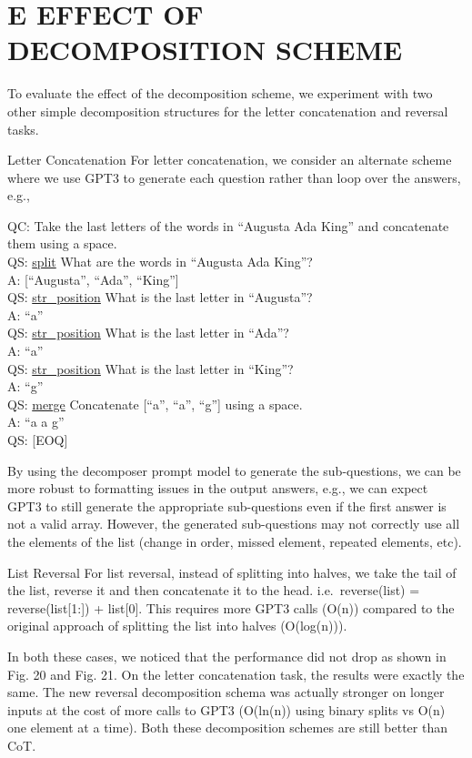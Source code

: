 \documentclass[
]{article}
\begin{document}
\section{E EFFECT OF DECOMPOSITION
SCHEME}\label{e-effect-of-decomposition-scheme}

To evaluate the effect of the decomposition scheme, we experiment with
two other simple decomposition structures for the letter concatenation
and reversal tasks.

Letter Concatenation For letter concatenation, we consider an alternate
scheme where we use GPT3 to generate each question rather than loop over
the answers, e.g.,

QC: Take the last letters of the words in ``Augusta Ada King'' and
concatenate them using a space.\\
QS: \hyperref[split]{split} What are the words in ``Augusta Ada
King''?\\
A: {[}``Augusta'', ``Ada'', ``King''{]}\\
QS: \hyperref[str_position]{str\_position} What is the last letter in
``Augusta''?\\
A: ``a''\\
QS: \hyperref[str_position]{str\_position} What is the last letter in
``Ada''?\\
A: ``a''\\
QS: \hyperref[str_position]{str\_position} What is the last letter in
``King''?\\
A: ``g''\\
QS: \hyperref[merge]{merge} Concatenate {[}``a'', ``a'', ``g''{]} using
a space.\\
A: ``a a g''\\
QS: {[}EOQ{]}

By using the decomposer prompt model to generate the sub-questions, we
can be more robust to formatting issues in the output answers, e.g., we
can expect GPT3 to still generate the appropriate sub-questions even if
the first answer is not a valid array. However, the generated
sub-questions may not correctly use all the elements of the list (change
in order, missed element, repeated elements, etc).

List Reversal For list reversal, instead of splitting into halves, we
take the tail of the list, reverse it and then concatenate it to the
head. i.e.~reverse(list) = reverse(list{[}1:{]}) + list{[}0{]}. This
requires more GPT3 calls (O(n)) compared to the original approach of
splitting the list into halves (O(log(n))).

In both these cases, we noticed that the performance did not drop as
shown in Fig. 20 and Fig. 21. On the letter concatenation task, the
results were exactly the same. The new reversal decomposition schema was
actually stronger on longer inputs at the cost of more calls to GPT3
(O(ln(n)) using binary splits vs O(n) one element at a time). Both these
decomposition schemes are still better than CoT.
\end{document}
